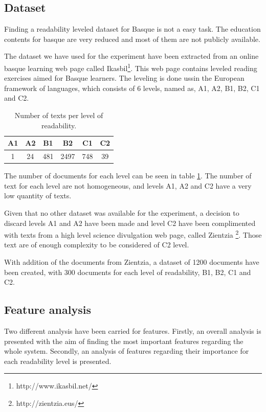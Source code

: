 \documentclass{acm_proc_article-sp}
\begin{document}
\subsection{Dataset}
Finding a readability leveled dataset for Basque is not a easy task. The education contents for basque are very reduced and most of them are not publicly available. 

The dataset we have used for the experiment have been extracted from an online basque learning web page called Ikasbil\footnote{http://www.ikasbil.net/}. This web page contains leveled reading exercises aimed for Basque learners. The leveling is done ussin the European framework of languages, which consists of 6 levels, named as, A1, A2, B1, B2, C1 and C2.  
\begin{table}[h]
 \begin{center}
 \begin{tabular}{|c|c|c|c|c|c|}\hline
  A1 & A2 & B1 & B2 & C1 & C2\\ \hline
  1 & 24 & 481 & 2497 & 748 & 39\\ \hline
 
 \end{tabular}
 \end{center}
 \caption{Number of texts per level of readability.}
 \label{tab:ikasbilTestuKopuruak}
\end{table}

The number of documents for each level can be seen in table \ref{tab:ikasbilTestuKopuruak}. The number of text for each level are not homogeneous, and levels A1, A2 and C2 have a very low quantity of texts.

Given that no other dataset was available for the experiment, a decision to discard levels A1 and A2 have been made and level C2 have been complimented with texts from a high level science divulgation web page, called Zientzia \footnote{http://zientzia.eus/}. Those text are of enough complexity to be considered of C2 level.

With addition of the documents from Zientzia, a dataset of 1200 documents have been created, with 300 documents for each level of readability, B1, B2, C1 and C2.



\subsection{Feature analysis}
 Two different analysis have been carried for features. Firstly, an overall analysis is presented with the aim of finding the most important features regarding the whole system. Secondly, an analysis of features regarding their importance for each readability level is presented.
\end{document}

